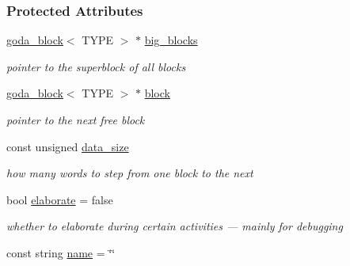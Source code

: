 \subsubsection*{Protected Attributes}
\begin{DoxyCompactItemize}
\item 
\mbox{\label{group__memorygroup_a4c411227a9a3646010a1f22840094c21}} 
\hyperlink{group__memorygroup_uniongoda__block}{goda\+\_\+block}$<$ T\+Y\+PE $>$ $\ast$ \hyperlink{group__memorygroup_a4c411227a9a3646010a1f22840094c21}{big\+\_\+blocks}
\begin{DoxyCompactList}\small\item\em pointer to the superblock of all blocks \end{DoxyCompactList}\item 
\mbox{\label{group__memorygroup_a15e185c6ba2c5262bc03ad13e2dbc223}} 
\hyperlink{group__memorygroup_uniongoda__block}{goda\+\_\+block}$<$ T\+Y\+PE $>$ $\ast$ \hyperlink{group__memorygroup_a15e185c6ba2c5262bc03ad13e2dbc223}{block}
\begin{DoxyCompactList}\small\item\em pointer to the next free block \end{DoxyCompactList}\item 
\mbox{\label{group__memorygroup_a7073b652fe474ccd684c1eebd2129a0b}} 
const unsigned \hyperlink{group__memorygroup_a7073b652fe474ccd684c1eebd2129a0b}{data\+\_\+size}
\begin{DoxyCompactList}\small\item\em how many words to step from one block to the next \end{DoxyCompactList}\item 
\mbox{\label{group__memorygroup_acab98f2bc46fec3c72ca281d1062d755}} 
bool \hyperlink{group__memorygroup_acab98f2bc46fec3c72ca281d1062d755}{elaborate} = false
\begin{DoxyCompactList}\small\item\em whether to elaborate during certain activities --- mainly for debugging \end{DoxyCompactList}\item 
\mbox{\label{group__memorygroup_a62a84f6bb1a339133100a8eb01dfccf2}} 
const string \hyperlink{group__memorygroup_a62a84f6bb1a339133100a8eb01dfccf2}{name} = \char`\"{}\char`\"{}

\end{DoxyCompactItemize}
